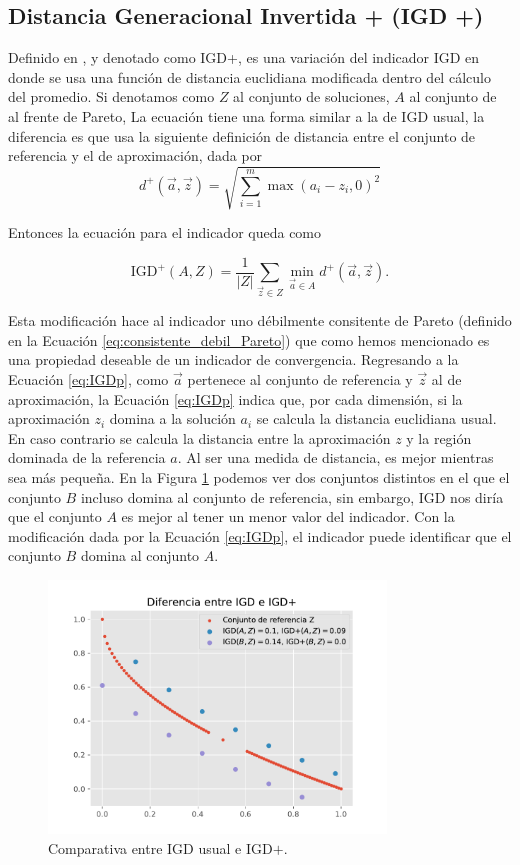 \subsection{Distancia Generacional Invertida + (IGD +)} \label{sec:IGDp}
Definido en \cite{ishibuchiModifiedDistanceCalculation2015}, y denotado como IGD+, es una variación del indicador IGD en donde se usa una función de distancia euclidiana modificada dentro del cálculo del promedio. Si denotamos como $Z$ al conjunto de soluciones, $A$ al conjunto de al frente de Pareto, La ecuación tiene una forma similar a la de IGD usual, la diferencia es que usa la siguiente definición de distancia entre el conjunto de referencia y el de aproximación, dada por $$d^{+}(\vec{a},\vec{z})=\sqrt{\sum_{i=1}^m \max(a_i-z_i,0)^2} $$

Entonces la ecuación para el indicador queda como

\begin{equation} \label{eq:IGDp}
    \text{IGD}^+(A,Z) =  \frac{1}{|Z|} \sum_{\vec{z}\in Z}\min_{\vec{a}\in A} d^{+}(\vec{a},\vec{z}).
\end{equation}


Esta modificación hace al indicador uno débilmente consitente de Pareto (definido en la Ecuación \ref{eq:consistente_debil_Pareto}) que como hemos mencionado es una propiedad deseable de un indicador de convergencia. Regresando a la Ecuación \ref{eq:IGDp}, como $\vec{a}$ pertenece al conjunto de referencia y $\vec{z}$ al de aproximación, la Ecuación \ref{eq:IGDp} indica que, por cada dimensión, si la aproximación $z_i$ domina a la solución $a_i$ se calcula la distancia euclidiana usual. En caso contrario se calcula la distancia entre la aproximación $z$ y la región dominada de la referencia $a$. Al ser una medida de distancia, es mejor mientras sea más pequeña. En la Figura \ref{fig:comp_IGD_IGDp} podemos ver dos conjuntos distintos  en el que el conjunto $B$ incluso domina al conjunto de referencia, sin embargo, IGD nos diría que el conjunto $A$ es mejor al tener un menor valor del indicador. Con la modificación dada por la Ecuación \ref{eq:IGDp}, el indicador puede identificar que el conjunto $B$ domina al conjunto $A$.

\begin{figure}[H]
    \centering
    \includegraphics[width=0.8\textwidth]{./Figuras/igdp_demo.pdf} 
    \caption[IGD vs IGD+]{Comparativa entre IGD usual e IGD$+$.}
    \label{fig:comp_IGD_IGDp}
\end{figure}

